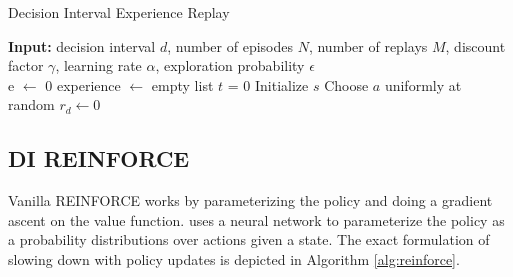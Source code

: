 \documentclass{article}
\begin{document}
\begin{algorithm}
\caption{Decision Interval Experience Replay}
\begin{algorithmic}
\STATE \textbf{Input:} decision interval $d$, number of episodes $N$, number of replays $M$, discount factor $\gamma$, learning rate $\alpha$, exploration probability $\epsilon$\\
\STATE e $\gets$ 0
\STATE experience $\gets$ empty list
{
\STATE $t$ = 0
\STATE Initialize $s$
\STATE Choose $a$ uniformly at random
\STATE $r_d \gets 0$
\ENDWHILE
{}\ENDIF
{}
}
\ENDWHILE

\end{algorithmic}
\end{algorithm}

\subsection{DI REINFORCE}
Vanilla REINFORCE works by parameterizing the policy and doing a gradient ascent on the value function. 
\citet{paszke2017automatic} uses a neural network to parameterize the policy as a probability distributions over actions given a state.  
The exact formulation of slowing down with policy updates is depicted in Algorithm \ref{alg:reinforce}. 
\end{document}
